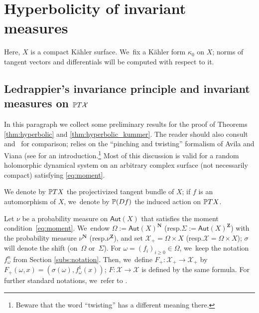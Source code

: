 \documentclass[11pt]{article}
\newcommand{\resp}{resp.\xspace}
\newcommand{\Subsection}{\subsection}
\def\Z{\mathbf{Z}}
\def\N{\mathbf{N}}
\newcommand{\cX}{\mathcal{X}}
\newcommand\Aut{\mathsf{Aut}}
\theoremstyle{plain}
\theoremstyle{definition}
\numberwithin{equation}{section}
\begin{document}
\section{Hyperbolicity of invariant measures}\label{sec:hyperbolicity}

Here, $X$ is a compact Kähler surface. We~fix a Kähler form $\kappa_0$ on $X$; norms of tangent vectors and differentials will be computed with respect to it.

\Subsection{Ledrappier's invariance principle and invariant measures on $\P T\cX$}\label{subs:ledrappier_invariance_principle}
In this paragraph we collect some preliminary results for the proof of Theorems \ref{thm:hyperbolic} and \ref{thm:hyperbolic_kummer}.
The reader should also consult~\cite{barrientos-malicet} and~\cite{obata-poletti} for comparison;
\cite{obata-poletti} relies on the ``pinching and twisting'' formalism of Avila and Viana
(see \cite{viana} for an introduction.\footnote{Beware that the word ``twisting'' has a different meaning there.}
Most of this discussion is valid for a random holomorphic dynamical system on an arbitrary complex surface (not necessarily compact)
satisfying \eqref{eq:moment}.

We denote by $ \P TX$ the projectivized tangent bundle of $X$; if $f$ is an automorphism of $X$, we~denote by $\P(Df)$ the induced action on $\P TX$.

Let $\nu$ be a probability measure on $\Aut(X)$ that satisfies the moment condition~\eqref{eq:moment}. We~endow $\Omega:=\Aut(X)^\N$ (\resp $\Sigma:= \Aut(X)^\Z$)
with the probability measure $\nu^\N$ (\resp $\nu^\Z$), and set $\cX_+=\Omega \times X$ (\resp $\cX=\Omega \times X$); $\sigma$ will denote the shift (on~$\Omega$ or~$\Sigma$).
For $\omega=(f_i)_{i\geq 0}\in \Omega$, we~keep the notation $f_\omega^{n}$ from
Section \ref{subs:notation}. Then, we~define $F_+\colon \cX_+\to \cX_+$ by
$F_+(\omega,x)=(\sigma(\omega), f^1_\omega(x))$; $F\colon \cX\to \cX$ is defined by the same formula. For further standard notations, we~refer to \cite[\S 7]{stiffness}.
\end{document}
